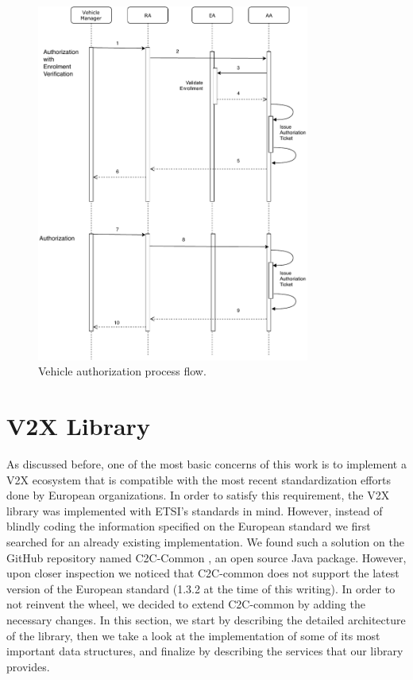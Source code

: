 \begin{figure}[!htb]
	\centering
	\includegraphics[width=0.8\textwidth]{Figures/protocolo_2}
	\caption{\label{fig:protocol_2}Vehicle authorization process flow.}
\end{figure}

\section{V2X Library}
As discussed before, one of the most basic concerns of this work is to implement a V2X ecosystem that is compatible with the most recent standardization efforts done by European organizations. In order to satisfy this requirement, the V2X library was implemented with ETSI’s standards in mind.
However, instead of blindly coding the information specified on the European standard we first searched for an already existing implementation. We found such a solution on the GitHub repository named C2C-Common \cite{c2c-common}, an open source Java package. However, upon closer inspection we noticed that C2C-common does not support the latest version of the European standard (1.3.2 at the time of this writing). In order to not reinvent the wheel, we decided to extend C2C-common by adding the necessary changes. In this section, we start by describing the detailed architecture of the library, then we take a look at the implementation of some of its most important data structures, and finalize by describing the services that our library provides. 

